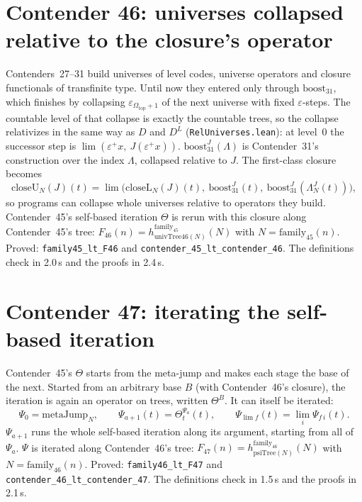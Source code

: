 \documentclass[11pt]{article}
\theoremstyle{definition}
\theoremstyle{remark}
\newcommand{\lean}[1]{\texttt{#1}}
\begin{document}
\section{Contender 46: universes collapsed relative to the closure's operator}

Contenders~27--31 build universes of level codes, universe operators and
closure functionals of transfinite type. Until now they entered only through
$\mathrm{boost}_{31}$, which finishes by collapsing $\varepsilon_{\Omega_{\mathrm{top}}+1}$
of the next universe with fixed $\varepsilon$-steps. The countable level of
that collapse is exactly the countable trees, so the collapse relativizes in
the same way as $D$ and $D^L$ (\lean{RelUniverses.lean}): at level~0 the
successor step is $\lim(\varepsilon^+x,\ J(\varepsilon^+x))$.
$\mathrm{boost}^J_{31}(\Lambda)$ is Contender~31's construction over the index
$\Lambda$, collapsed relative to $J$. The first-class closure becomes
\[
\mathrm{closeU}_N(J)(t)=\lim\bigl(\mathrm{closeL}_N(J)(t),\ \mathrm{boost}^J_{31}(t),\
\mathrm{boost}^J_{31}(\Lambda^J_N(t))\bigr),
\]
so programs can collapse whole universes relative to operators they build.
Contender~45's self-based iteration $\Theta$ is rerun with this closure along
Contender~45's tree:
$F_{46}(n)=h^{\mathrm{family}_{45}}_{\mathrm{univTree46}(N)}(N)$ with
$N=\mathrm{family}_{45}(n)$. Proved: \lean{family45\_lt\_F46} and
\lean{contender\_45\_lt\_\allowbreak contender\_46}. The definitions check in
2.0\,s and the proofs in 2.4\,s.

\section{Contender 47: iterating the self-based iteration}

Contender~45's $\Theta$ starts from the meta-jump and makes each stage the
base of the next. Started from an arbitrary base $B$ (with Contender~46's
closure), the iteration is again an operator on trees, written
$\Theta^B$. It can itself be iterated:
\[
\Psi_0=\mathrm{metaJump}_N,\qquad \Psi_{a+1}(t)=\Theta^{\Psi_a}_t(t),\qquad
\Psi_{\lim f}(t)=\lim_i\Psi_{f\,i}(t).
\]
$\Psi_{a+1}$ runs the whole self-based iteration along its argument, starting
from all of $\Psi_a$. $\Psi$ is iterated along Contender~46's tree:
$F_{47}(n)=h^{\mathrm{family}_{46}}_{\mathrm{psiTree}(N)}(N)$ with
$N=\mathrm{family}_{46}(n)$. Proved: \lean{family46\_lt\_F47} and
\lean{contender\_46\_lt\_\allowbreak contender\_47}. The definitions check in
1.5\,s and the proofs in 2.1\,s.
\end{document}

